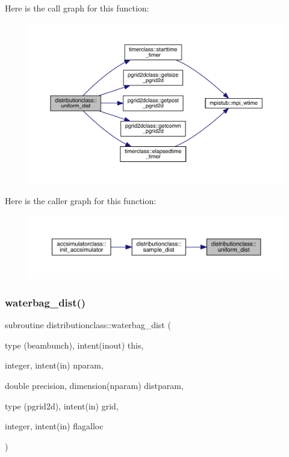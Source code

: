 Here is the call graph for this function\+:\nopagebreak
\begin{figure}[H]
\begin{center}
\leavevmode
\includegraphics[width=350pt]{namespacedistributionclass_a5e52f4e8f1be5bbedde152f2263e74af_cgraph}
\end{center}
\end{figure}
Here is the caller graph for this function\+:\nopagebreak
\begin{figure}[H]
\begin{center}
\leavevmode
\includegraphics[width=350pt]{namespacedistributionclass_a5e52f4e8f1be5bbedde152f2263e74af_icgraph}
\end{center}
\end{figure}
\mbox{\label{namespacedistributionclass_aed734df6d00f7004cf11847adb42dd1d}} 
\subsubsection{\texorpdfstring{waterbag\_dist()}{waterbag\_dist()}}
{\footnotesize\ttfamily subroutine distributionclass\+::waterbag\+\_\+dist (\begin{DoxyParamCaption}\item[{type (beambunch), intent(inout)}]{this,  }\item[{integer, intent(in)}]{nparam,  }\item[{double precision, dimension(nparam)}]{distparam,  }\item[{type (pgrid2d), intent(in)}]{grid,  }\item[{integer, intent(in)}]{flagalloc }\end{DoxyParamCaption})}



